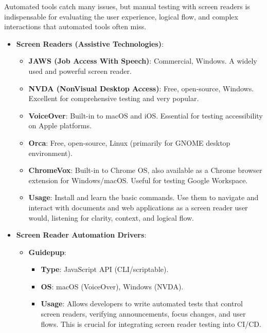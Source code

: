 Automated tools catch many issues, but manual testing with screen readers is indispensable for evaluating the user experience, logical flow, and complex interactions that automated tools often miss.

\begin{itemize}
    \item \textbf{Screen Readers (Assistive Technologies)}:
        \begin{itemize}
            \item \textbf{JAWS (Job Access With Speech)}\cite{JAWS}: Commercial, Windows. A widely used and powerful screen reader.
            \item \textbf{NVDA (NonVisual Desktop Access)}\cite{NVDA}: Free, open-source, Windows. Excellent for comprehensive testing and very popular.
            \item \textbf{VoiceOver}\cite{VoiceOver}: Built-in to macOS and iOS. Essential for testing accessibility on Apple platforms.
            \item \textbf{Orca}\cite{Orca}: Free, open-source, Linux (primarily for GNOME desktop environment).
            \item \textbf{ChromeVox}\cite{ChromeVox}: Built-in to Chrome OS, also available as a Chrome browser extension for Windows/macOS. Useful for testing Google Workspace.
            \item \textbf{Usage}: Install and learn the basic commands. Use them to navigate and interact with documents and web applications as a screen reader user would, listening for clarity, context, and logical flow.
        \end{itemize}
    \item \textbf{Screen Reader Automation Drivers}:
        \begin{itemize}
            \item \textbf{Guidepup}\cite{Guidepup}:
                \begin{itemize}
                    \item \textbf{Type}: JavaScript API (CLI/scriptable).
                    \item \textbf{OS}: macOS (VoiceOver), Windows (NVDA).
                    \item \textbf{Usage}: Allows developers to write automated tests that control screen readers, verifying announcements, focus changes, and user flows. This is crucial for integrating screen reader testing into CI/CD.
                \end{itemize}
        \end{itemize}
\end{itemize}


